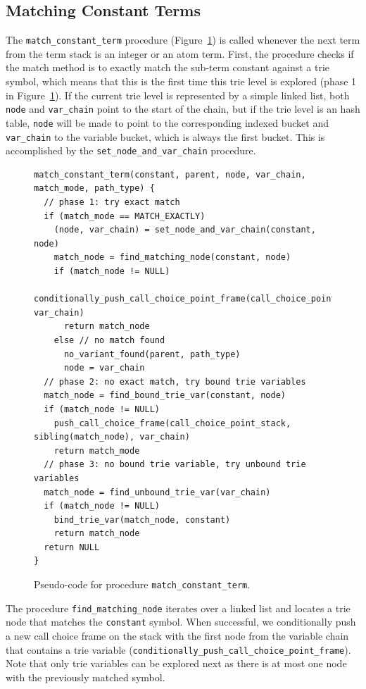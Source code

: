 \subsection{Matching Constant Terms}

The \texttt{match\_constant\_term} procedure (Figure~\ref{fig:match_constant}) is called whenever the
next term from the term stack is an integer or an atom term.
First, the procedure checks if the match method is to exactly match the
sub-term constant against a trie symbol, which means
that this is the first time this trie level is explored (phase 1 in Figure~\ref{fig:match_constant}).
If the current trie level is represented by a simple linked list, both \texttt{node} and \texttt{var\_chain}
point to the start of the chain, but if the trie level is an hash table,
\texttt{node} will be made to point to the corresponding indexed bucket and \texttt{var\_chain}
to the variable bucket, which is always the first bucket. This is accomplished by the \texttt{set\_node\_and\_var\_chain}
procedure.

\begin{figure}[ht]
\begin{Verbatim}
match_constant_term(constant, parent, node, var_chain, match_mode, path_type) {
  // phase 1: try exact match
  if (match_mode == MATCH_EXACTLY)
    (node, var_chain) = set_node_and_var_chain(constant, node)
    match_node = find_matching_node(constant, node)
    if (match_node != NULL)
      conditionally_push_call_choice_point_frame(call_choice_point_stack, var_chain)
      return match_node
    else // no match found  
      no_variant_found(parent, path_type)
      node = var_chain
  // phase 2: no exact match, try bound trie variables
  match_node = find_bound_trie_var(constant, node)
  if (match_node != NULL)
    push_call_choice_frame(call_choice_point_stack, sibling(match_node), var_chain)
    return match_mode
  // phase 3: no bound trie variable, try unbound trie variables
  match_node = find_unbound_trie_var(var_chain)
  if (match_node != NULL)
    bind_trie_var(match_node, constant)
    return match_node
  return NULL
}
\end{Verbatim}
\caption{Pseudo-code for procedure \texttt{match\_constant\_term}.}
\label{fig:match_constant}
\end{figure}

The procedure \texttt{find\_matching\_node} iterates over a linked list and locates a trie node that matches the
\texttt{constant} symbol. When successful, we conditionally push a new call choice frame on the stack
with the first node from the variable chain that contains a trie variable
(\texttt{conditionally\_push\_call\_choice\_point\_frame}).
Note that only trie variables can be explored next as there is at most one node with the previously
matched symbol.

